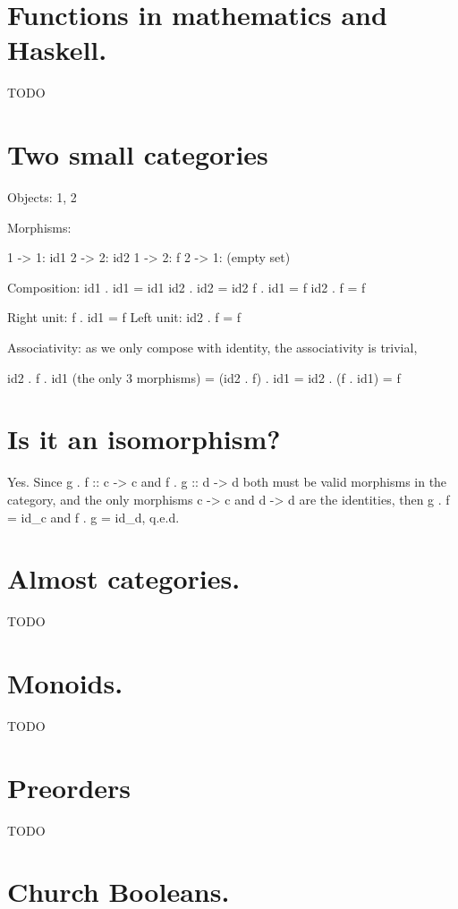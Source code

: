 \section{ Functions in mathematics and Haskell. }

TODO %

\section{Two small categories}

Objects: 1, 2

Morphisms: 

1 -> 1: id1
2 -> 2: id2
1 -> 2: f
2 -> 1: (empty set)

Composition:
  id1 . id1 = id1
  id2 . id2 = id2
  f . id1 = f
  id2 . f = f

Right unit: f . id1 = f
Left unit: id2 . f = f

Associativity: as we only compose with identity, the associativity is trivial,

   id2 . f . id1 (the only 3 morphisms) = (id2 . f) . id1 = id2 . (f . id1) = f

\section{ Is it an isomorphism? }

Yes. Since g . f :: c -> c and f . g :: d -> d both must be valid morphisms
in the category, and the only morphisms c -> c and d -> d are the identities,
then g . f = id_c and f . g = id_d, q.e.d.

\section{ Almost categories. }

TODO

\section{ Monoids. }

TODO

\section{ Preorders }

TODO

\section{ Church Booleans. }

